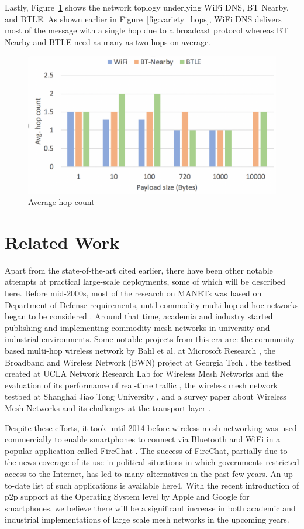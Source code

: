 \documentclass[conference]{IEEEtran}
\begin{document}
Lastly, Figure~\ref{fig:hop} shows the network toplogy underlying WiFi
DNS, BT Nearby, and BTLE. As shown earlier in
Figure~\ref{fig:variety_hops}, WiFi DNS delivers most of the message
with a single hop due to a broadcast protocol whereas BT Nearby and
BTLE need as many as two hops on average.
%
\begin{figure}[htbp]
\centerline{\includegraphics[width=\columnwidth]{figs/hops}}
\caption{Average hop count}
\label{fig:hop}
\end{figure}
%
%
\section{Related Work}
\label{sec:related}
%
Apart from the state-of-the-art cited earlier, there have been other
notable attempts at practical large-scale deployments, some of which
will be described here. Before mid-2000s, most of the research on
MANETs was based on Department of Defense requirements, until
commodity multi-hop ad hoc networks began to be considered
\cite{bruno-mesh-2005}. Around that time, academia and industry
started publishing and implementing commodity mesh networks in
university and industrial environments. Some notable projects from
this era are: the community-based multi-hop wireless network by Bahl
et al. at Microsoft Research \cite{microsoft-mesh}, the Broadband and
Wireless Network (BWN) project at Georgia Tech \cite{gatech-mesh}, the
testbed created at UCLA Network Research Lab for Wireless Mesh
Networks and the evaluation of its performance of real-time traffic
\cite{chavoutier-2007}, the wireless mesh network testbed at Shanghai
Jiao Tong University \cite{wu-mesh-2010}, and a survey paper about
Wireless Mesh Networks and its challenges at the transport layer
\cite{saha-mesh-2014}.

Despite these efforts, it took until 2014 before wireless mesh
networking was used commercially to enable smartphones to connect via
Bluetooth and WiFi in a popular application called FireChat
\cite{firechat}. The success of FireChat, partially due to the news
coverage of its use in political situations in which governments
restricted access to the Internet, has led to many alternatives in the
past few years. An up-to-date list of such applications is available
here4. With the recent introduction of p2p support at the Operating
System level by Apple and Google for smartphones, we believe there
will be a significant increase in both academic and industrial
implementations of large scale mesh networks in the upcoming years.
%
\end{document}
